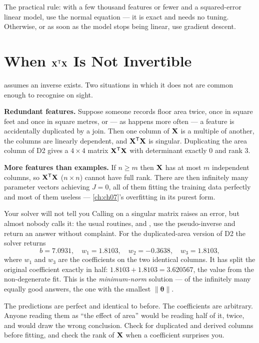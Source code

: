 The practical rule: with a few thousand features or fewer and a squared-error
linear model, use the normal equation --- it is exact and needs no tuning.
Otherwise, or as soon as the model stops being linear, use gradient descent.

\section{When \texorpdfstring{$\mathbf{X}^{\mathsf{T}}\mathbf{X}$}{X'X} Is Not Invertible}
\label{sec:singular}

 assumes an inverse exists. Two situations in which it
does not are common enough to recognise on sight.

\textbf{Redundant features.} Suppose someone records floor area twice, once in
square feet and once in square metres, or --- as happens more often --- a feature
is accidentally duplicated by a join. Then one column of $\mathbf{X}$ is a multiple of
another, the columns are linearly dependent, and $\mathbf{X}^{\mathsf{T}}\mathbf{X}$ is
singular. Duplicating the area column of D2 gives a $4\times 4$ matrix
$\mathbf{X}^{\mathsf{T}}\mathbf{X}$ with determinant exactly $0$ and rank $3$.

\textbf{More features than examples.} If $n \ge m$ then $\mathbf{X}$ has at most $m$
independent columns, so $\mathbf{X}^{\mathsf{T}}\mathbf{X}$ ($n\times n$) cannot have full
rank. There are then infinitely many parameter vectors achieving $J = 0$, all of
them fitting the training data perfectly and most of them useless ---
\cref{ch:ch07}'s overfitting in its purest form.

\begin{pitfall}{Your solver will not tell you}
Calling  on a singular matrix raises an error, but almost
nobody calls it: the usual routines,  and
, use the pseudo-inverse and return
an answer without complaint. For the duplicated-area version of D2 the solver
returns
\[
  b = 7.0931,\quad w_1 = 1.8103,\quad w_2 = -0.3638,\quad w_3 = 1.8103,
\]
where $w_1$ and $w_3$ are the coefficients on the two identical columns. It has
split the original coefficient exactly in half: $1.8103 + 1.8103 = 3.620567$,
the value from the non-degenerate fit. This is the \emph{minimum-norm} solution
--- of the infinitely many equally good answers, the one with the smallest
$\|\bm{\theta}\|$.

The predictions are perfect and identical to before. The coefficients are
arbitrary. Anyone reading them as ``the effect of area'' would be reading half
of it, twice, and would draw the wrong conclusion. Check for duplicated and
derived columns before fitting, and check the rank of $\mathbf{X}$ when a coefficient
surprises you.
\end{pitfall}

